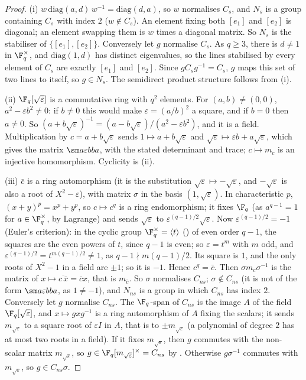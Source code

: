 \begin{proof}
(i) $w\,\mathrm{diag}(a,d)\,w^{-1}=\mathrm{diag}(d,a)$, so $w$ normalises $C_s$, and $N_s$ is a group containing $C_s$ with index $2$ ($w\notin C_s$). An element fixing both $[e_1]$ and
$[e_2]$ is diagonal; an element swapping them is $w$ times a diagonal matrix. So $N_s$ is the stabiliser of $\{[e_1],[e_2]\}$. Conversely let $g$ normalise $C_s$. As
$q\ge3$, there is $d\ne1$ in $\F_q^\times$, and $\mathrm{diag}(1,d)$ has distinct eigenvalues, so the lines stabilised by every element of $C_s$ are exactly $[e_1]$ and $[e_2]$.
Since $gC_sg^{-1}=C_s$, $g$ maps this set of two lines to itself, so $g\in N_s$. The semidirect product structure follows from (i).

(ii) $\F_q[\sqrt\varepsilon]$ is a commutative ring with $q^2$ elements. For $(a,b)\ne(0,0)$, $a^2-\varepsilon b^2\ne0$: if $b\ne0$ this would make $\varepsilon=(a/b)^2$ a square, and if $b=0$
then $a\ne0$. So $(a+b\sqrt\varepsilon)^{-1}=(a-b\sqrt\varepsilon)/(a^2-\varepsilon b^2)$, and it is a field. Multiplication by $c=a+b\sqrt\varepsilon$ sends $1\mapsto a+b\sqrt\varepsilon$ and
$\sqrt\varepsilon\mapsto\varepsilon b+a\sqrt\varepsilon$, which gives the matrix $\sm a{\varepsilon b}ba$, with the stated determinant and trace; $c\mapsto m_c$ is an injective homomorphism.
Cyclicity is (ii).

(iii) $\bar c$ is a ring automorphism (it is the substitution $\sqrt\varepsilon\mapsto-\sqrt\varepsilon$, and $-\sqrt\varepsilon$ is also a root of $X^2-\varepsilon$), with matrix $\sigma$ in the basis
$(1,\sqrt\varepsilon)$. In characteristic $p$, $(x+y)^p=x^p+y^p$, so $c\mapsto c^q$ is a ring endomorphism; it fixes $\F_q$ (as $a^{q-1}=1$ for $a\in\F_q^\times$, by Lagrange) and sends
$\sqrt\varepsilon$ to $\varepsilon^{(q-1)/2}\sqrt\varepsilon$. Now $\varepsilon^{(q-1)/2}=-1$ (Euler's criterion): in the cyclic group $\F_q^\times=\langle t\rangle$ () of even order $q-1$, the squares are
the even powers of $t$, since $q-1$ is even; so $\varepsilon=t^m$ with $m$ odd, and $\varepsilon^{(q-1)/2}=t^{m(q-1)/2}\ne1$, as $q-1\nmid m(q-1)/2$. Its square is $1$, and the only
roots of $X^2-1$ in a field are $\pm1$; so it is $-1$. Hence $c^q=\bar c$. Then $\sigma m_c\sigma^{-1}$
is the matrix of $x\mapsto\overline{c\,\bar x}=\bar cx$, that is $m_{\bar c}$. So $\sigma$ normalises $C_{ns}$; $\sigma\notin C_{ns}$ (it is not of the form $\sm a{\varepsilon b}ba$, as
$1\ne-1$), and $N_{ns}$ is a group in which $C_{ns}$ has index $2$. Conversely let $g$ normalise $C_{ns}$. The $\F_q$-span of $C_{ns}$ is the image $A$ of the field
$\F_q[\sqrt\varepsilon]$, and $x\mapsto gxg^{-1}$ is a ring automorphism of $A$ fixing the scalars; it sends $m_{\sqrt\varepsilon}$ to a square root of $\varepsilon I$ in $A$, that is to
$\pm m_{\sqrt\varepsilon}$ (a polynomial of degree $2$ has at most two roots in a field). If it fixes $m_{\sqrt\varepsilon}$, then $g$ commutes with the non-scalar matrix
$m_{\sqrt\varepsilon}$, so $g\in\F_q[m_{\sqrt\varepsilon}]^\times=C_{ns}$ by . Otherwise $g\sigma^{-1}$ commutes with $m_{\sqrt\varepsilon}$, so $g\in C_{ns}\sigma$.


\end{proof}
